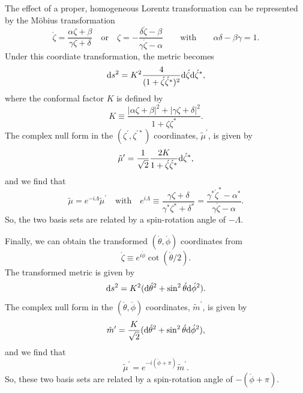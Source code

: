 \documentclass[11pt]{article}
\begin{document}
The effect of a proper, homogeneous Lorentz transformation can be
represented by the M\"{o}bius transformation
\begin{equation}\label{eq:Mobius-def}
  \acute\zeta = \frac{\alpha\zeta+\beta}{\gamma\zeta+\delta}
\quad\mbox{or}\quad
  \zeta = -\frac{\delta\acute\zeta-\beta}{\gamma\acute\zeta-\alpha}
\qquad\mbox{with}\qquad
\alpha\delta-\beta\gamma=1.
\end{equation}
Under this coordiate transformation, the metric becomes
\begin{equation}
  {\rm d}s^2 = K^2\frac4{(1+\acute\zeta\acute\zeta^*)^2}
              {\rm d}\acute\zeta{\rm d}\acute\zeta^*,
\end{equation}
where the conformal factor $K$ is defined by
\begin{equation}
  K\equiv \frac{|\alpha\zeta+\beta|^2+|\gamma\zeta+\delta|^2}{1+\zeta\zeta^*}.
\end{equation}
The complex null form in the $(\zeta^\prime,\zeta^{\prime*})$ coordinates,
$\tilde\mu^\prime$, is given by
\begin{equation}
  \tilde\mu^\prime = \frac1{\sqrt2}\frac{2K}{1+\acute\zeta\acute\zeta^*}
           {\rm d}\acute\zeta^*,
\end{equation}
and we find that
\begin{equation}
  \tilde\mu = e^{-i\Lambda}\tilde\mu^\prime
\quad\mbox{with}\quad e^{i\Lambda}\equiv 
   \frac{\gamma\zeta+\delta}{\gamma^*\zeta^*+\delta^*} =
   \frac{\gamma^*\acute\zeta^*-\alpha^*}{\gamma\acute\zeta-\alpha}.
\end{equation}
So, the two basis sets are related by a spin-rotation angle of $-\Lambda$.

Finally, we can obtain the transformed $(\acute\theta,\acute\phi)$
coordinates from
\begin{equation}
  \acute\zeta\equiv e^{i\acute\phi}\cot(\acute\theta/2).
\end{equation}
The transformed metric is given by
\begin{equation}
{\rm d}s^2 = K^2({\rm d}\acute\theta^2+\sin^2\acute\theta{\rm d}\acute\phi^2).
\end{equation}
The complex null form in the $(\acute\theta,\acute\phi)$ coordinates,
$\tilde{m}^\prime$, is given by
\begin{equation}
\tilde{m}^\prime = \frac{K}{\sqrt2}
      ({\rm d}\acute\theta^2+\sin^2\acute\theta{\rm d}\acute\phi^2),
\end{equation}
and we find that
\begin{equation}
\tilde\mu^\prime = e^{-i(\acute\phi+\pi)}\tilde{m}^\prime.
\end{equation}
So, these two basis sets are related by a spin-rotation angle of
$-(\acute\phi+\pi)$.
\end{document}
